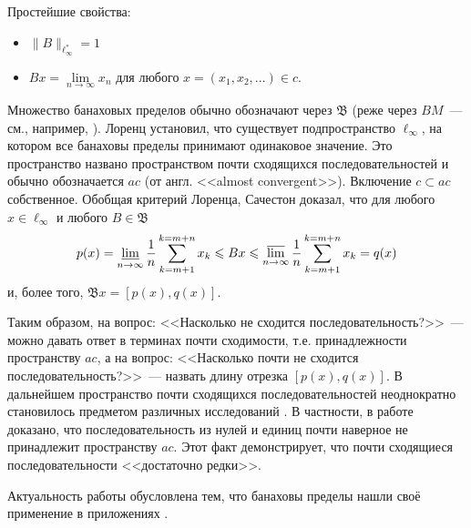 \documentclass[a4paper,openbib]{report}
\renewcommand{\leq}{\leqslant}
\begin{document}
Простейшие свойства:
\begin{itemize}
	\item
		$\|B\|_{\ell_\infty^*} = 1$
	\item
		$Bx = \lim\limits_{n\to\infty} x_n$ для любого $x=(x_1, x_2, ...) \in c$.

\end{itemize}

Множество банаховых пределов обычно обозначают через $\mathfrak{B}$
(реже через $BM$~--- см., например, \cite{alekhno2012superposition,alekhno2015banach}).
%
Лоренц \cite{lorentz1948contribution} установил, что существует подпространство $\ell_\infty$,
на котором все банаховы пределы принимают одинаковое значение.
Это пространство названо пространством почти сходящихся последовательностей и обычно обозначается $ac$
(от англ. <<almost convergent>>).
Включение $c \subset ac$ собственное.
%
%
Обобщая критерий Лоренца, Сачестон \cite{sucheston1967banach} доказал, что для любого $x\in\ell_\infty$
и любого $B\in\mathfrak{B}$
\begin{equation*}
	p(x) = \varliminf_{n\to\infty} \frac{1}{n} \sum_{k=m+1}^{k=m+n} x_k
	\leq
	Bx
	\leq
	\varlimsup_{n\to\infty} \frac{1}{n} \sum_{k=m+1}^{k=m+n} x_k
	= q(x)
\end{equation*}
и, более того,
$
	\mathfrak{B}x = [p(x), q(x)]
	.
$

Таким образом, на вопрос: <<Насколько не сходится последовательность?>>~---
можно давать ответ в терминах почти сходимости, т.е. принадлежности пространству $ac$,
а на вопрос: <<Насколько почти не сходится последовательность?>>~---
назвать длину отрезка $[p(x), q(x)]$.
В дальнейшем пространство почти сходящихся последовательностей неоднократно становилось предметом
различных исследований
\cite{semenov2006space,usachev2008transformations}.
В частности, в работе~\cite{connor1990almost} доказано,
что последовательность из нулей и единиц почти наверное не принадлежит пространству $ac$.
Этот факт демонстрирует, что почти сходящиеся последовательности <<достаточно редки>>.


Актуальность работы обусловлена тем, что
банаховы пределы нашли своё применение в приложениях
\cite{semenov2015banachtraces,semenov2009fourier,strukova2015spectres}.

\end{document}
